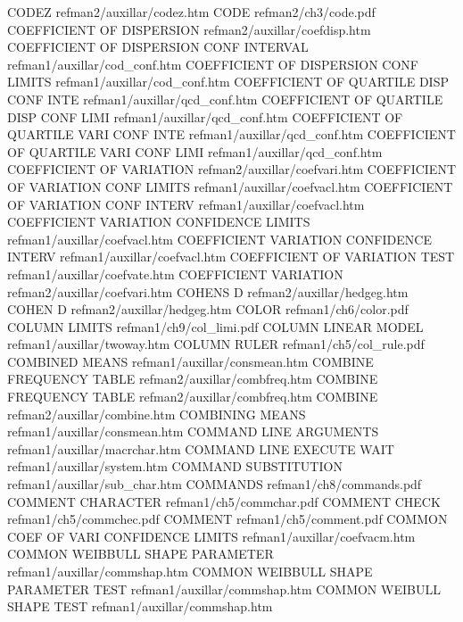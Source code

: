 CODEZ                                   refman2/auxillar/codez.htm
CODE                                    refman2/ch3/code.pdf
COEFFICIENT OF DISPERSION               refman2/auxillar/coefdisp.htm
COEFFICIENT OF DISPERSION CONF INTERVAL refman1/auxillar/cod_conf.htm
COEFFICIENT OF DISPERSION CONF LIMITS   refman1/auxillar/cod_conf.htm
COEFFICIENT OF QUARTILE DISP CONF INTE  refman1/auxillar/qcd_conf.htm
COEFFICIENT OF QUARTILE DISP CONF LIMI  refman1/auxillar/qcd_conf.htm
COEFFICIENT OF QUARTILE VARI CONF INTE  refman1/auxillar/qcd_conf.htm
COEFFICIENT OF QUARTILE VARI CONF LIMI  refman1/auxillar/qcd_conf.htm
COEFFICIENT OF VARIATION                refman2/auxillar/coefvari.htm
COEFFICIENT OF VARIATION CONF LIMITS    refman1/auxillar/coefvacl.htm
COEFFICIENT OF VARIATION CONF INTERV    refman1/auxillar/coefvacl.htm
COEFFICIENT VARIATION CONFIDENCE LIMITS refman1/auxillar/coefvacl.htm
COEFFICIENT VARIATION CONFIDENCE INTERV refman1/auxillar/coefvacl.htm
COEFFICIENT OF VARIATION TEST           refman1/auxillar/coefvate.htm
COEFFICIENT VARIATION                   refman2/auxillar/coefvari.htm
COHENS D                                refman2/auxillar/hedgeg.htm
COHEN D                                 refman2/auxillar/hedgeg.htm
COLOR                                   refman1/ch6/color.pdf
COLUMN LIMITS                           refman1/ch9/col_limi.pdf
COLUMN LINEAR MODEL                     refman1/auxillar/twoway.htm
COLUMN RULER                            refman1/ch5/col_rule.pdf
COMBINED MEANS                          refman1/auxillar/consmean.htm
COMBINE FREQUENCY TABLE                 refman2/auxillar/combfreq.htm
COMBINE FREQUENCY TABLE                 refman2/auxillar/combfreq.htm
COMBINE                                 refman2/auxillar/combine.htm
COMBINING MEANS                         refman1/auxillar/consmean.htm
COMMAND LINE ARGUMENTS                  refman1/auxillar/macrchar.htm
COMMAND LINE EXECUTE WAIT               refman1/auxillar/system.htm
COMMAND SUBSTITUTION                    refman1/auxillar/sub_char.htm
COMMANDS                                refman1/ch8/commands.pdf
COMMENT CHARACTER                       refman1/ch5/commchar.pdf
COMMENT CHECK                           refman1/ch5/commchec.pdf
COMMENT                                 refman1/ch5/comment.pdf
COMMON COEF OF VARI CONFIDENCE LIMITS   refman1/auxillar/coefvacm.htm
COMMON WEIBBULL SHAPE PARAMETER         refman1/auxillar/commshap.htm
COMMON WEIBBULL SHAPE PARAMETER TEST    refman1/auxillar/commshap.htm
COMMON WEIBULL SHAPE TEST               refman1/auxillar/commshap.htm
